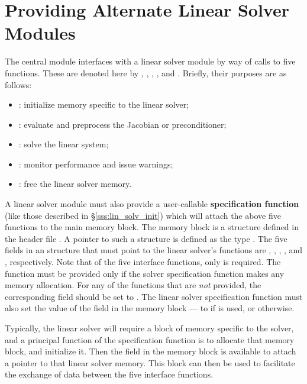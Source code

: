 \chapter{Providing Alternate Linear Solver Modules}\label{s:new_linsolv}
The central {\ida} module interfaces with a linear solver module 
by way of calls to five functions.  These are denoted here by 
, , , , and .
Briefly, their purposes are as follows:
\begin{itemize}
\item {}: initialize memory specific to the linear solver;
\item {}: evaluate and preprocess the Jacobian or preconditioner;
\item {}: solve the linear system;
\item {}: monitor performance and issue warnings;
\item {}: free the linear solver memory.
\end{itemize}
A linear solver module must also provide a user-callable {\bf specification function}
(like those described in \S\ref{sss:lin_solv_init}) which will attach
the above five functions to the main {\ida} memory block. 
The {\ida} memory block is a structure defined in the header file . 
A pointer to such a structure is defined as the type . 
The five fields in an  structure that must point to the linear solver's 
functions are , , , , 
and , respectively.
Note that of the five interface functions, only  is required. 
The  function must be provided only if the solver specification function
makes any memory allocation.   For any of the functions that are
{\it not} provided, the corresponding field should be set to .
The linear solver specification function must also set the value of
the field  in the {\ida} memory block --- to
 if  is used, or  otherwise.

Typically, the linear solver will require a block of memory specific
to the solver, and a principal function of the specification function
is to allocate that memory block, and initialize it.  Then the field
 in the {\ida} memory block is available to attach a
pointer to that linear solver memory.  This block can then be used
to facilitate the exchange of data between the five interface
functions.

